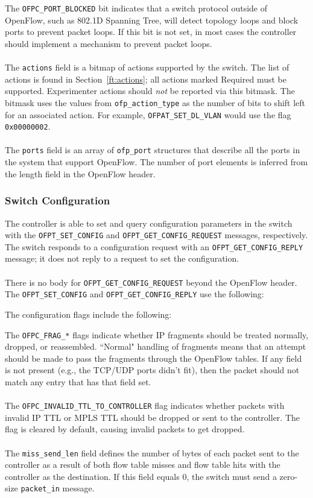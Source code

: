  
The \verb|OFPC_PORT_BLOCKED| bit indicates that a switch protocol outside of OpenFlow, such as 802.1D Spanning Tree, will detect topology loops and block ports to prevent packet loops. If this bit is not set, in most cases the controller should implement a mechanism to prevent packet loops.
\\\\
The \verb|actions| field is a bitmap of actions supported by the switch.  The list of actions is found in Section~\ref{ft:actions}; all actions marked Required must be supported. Experimenter actions should \emph{not} be reported via this bitmask. The bitmask uses the values from \verb|ofp_action_type| as the number of bits to shift left for an associated action. For example, \verb|OFPAT_SET_DL_VLAN| would use the flag \verb|0x00000002|.
\\\\
The \verb|ports| field is an array of \verb|ofp_port| structures that describe all the ports in the system that support OpenFlow.  The number of port elements is inferred from the length field in the OpenFlow header. 

\subsubsection{Switch Configuration}
\label{sec:switch_config}
The controller is able to set and query configuration parameters in the switch with the \verb|OFPT_SET_CONFIG| and \verb|OFPT_GET_CONFIG_REQUEST| messages, respectively.  The switch responds to a configuration request with an \verb|OFPT_GET_CONFIG_REPLY| message; it does not reply to a request to set the configuration.  
\\\\
There is no body for \verb|OFPT_GET_CONFIG_REQUEST| beyond the OpenFlow header.  The \verb|OFPT_SET_CONFIG| and \verb|OFPT_GET_CONFIG_REPLY| use the following:


The configuration flags include the following:


The \verb|OFPC_FRAG_*| flags indicate whether IP fragments should be treated normally, dropped, or reassembled.  ``Normal" handling of fragments means that an attempt should be made to pass the fragments through the OpenFlow tables. If any field is not present (e.g., the TCP/UDP ports didn't fit), then the packet should not match any entry that has that field set.
\\\\
The \verb|OFPC_INVALID_TTL_TO_CONTROLLER| flag indicates whether packets with invalid IP TTL or MPLS TTL should be dropped or sent to the controller.  The flag is cleared by default, causing invalid packets to get dropped.
\\\\
The \verb|miss_send_len| field defines the number of bytes of each packet sent to the controller as a result of both flow table misses and flow table hits with the controller as the destination.  If this field equals 0, the switch must send a zero-size \verb|packet_in| message.

